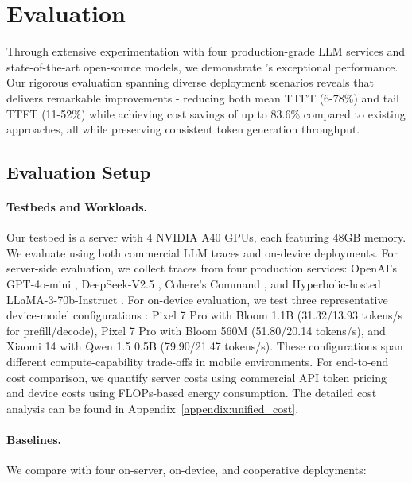 \section{Evaluation}
\label{sec:evaluation}

Through extensive experimentation with four production-grade LLM services and state-of-the-art open-source models, we demonstrate \disco{}'s exceptional performance. Our rigorous evaluation spanning diverse deployment scenarios reveals that \disco{} delivers remarkable improvements - reducing both mean TTFT (6-78\%) and tail TTFT (11-52\%) while achieving cost savings of up to 83.6\% compared to existing approaches, all while preserving consistent token generation throughput.

\subsection{Evaluation Setup}
\paragraph{Testbeds and Workloads.} 
Our testbed is a server with 4 NVIDIA A40 GPUs, each featuring 48GB memory. 
We evaluate \disco{} using both commercial LLM traces and on-device deployments. For server-side evaluation, we collect traces from four production services: OpenAI's GPT-4o-mini \citep{gpt-4o-mini}, DeepSeek-V2.5 \citep{deepseek-v2_5}, Cohere's Command \citep{command}, and Hyperbolic-hosted LLaMA-3-70b-Instruct \citep{llama3-70b}. For on-device evaluation, we test three representative device-model configurations \citep{edgebenchmark}: Pixel 7 Pro with Bloom 1.1B (31.32/13.93 tokens/s for prefill/decode), Pixel 7 Pro with Bloom 560M (51.80/20.14 tokens/s), and Xiaomi 14 with Qwen 1.5 0.5B (79.90/21.47 tokens/s). These configurations span different compute-capability trade-offs in mobile environments. 
For end-to-end cost comparison, we quantify server costs using commercial API token pricing and device costs using FLOPs-based energy consumption. The detailed cost analysis can be found in Appendix~\ref{appendix:unified_cost}.

\paragraph{Baselines.} 
We compare \disco{} with four on-server, on-device, and cooperative deployments: 


